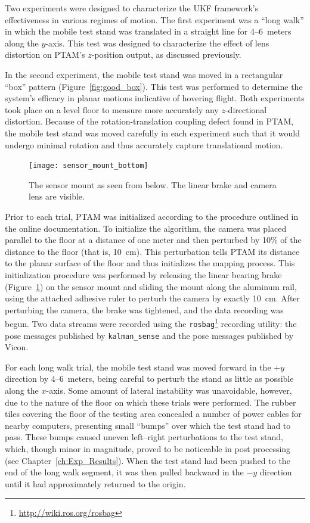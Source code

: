 Two experiments were designed to characterize the UKF framework's effectiveness in various regimes of motion. The first experiment was a ``long walk'' in which the mobile test stand was translated in a straight line for 4--6~meters along the $y$-axis. This test was designed to characterize the effect of lens distortion on PTAM's $z$-position output, as discussed previously.

In the second experiment, the mobile test stand was moved in a rectangular ``box'' pattern (Figure~\ref{fig:good_box}). This test was performed to determine the system's efficacy in planar motions indicative of hovering flight. Both experiments took place on a level floor to measure more accurately any $z$-directional distortion. Because of the rotation-translation coupling defect found in PTAM, the mobile test stand was moved carefully in each experiment such that it would undergo minimal rotation and thus accurately capture translational motion.

\begin{figure}
        \centering
        \texttt{[image: sensor\_mount\_bottom]}
        \caption[Sensor Mount Bottom View]{The sensor mount as seen from below. The linear brake and camera lens are visible.}
        \label{fig:sensor_mount_bottom}
\end{figure}

Prior to each trial, PTAM was initialized according to the procedure outlined in the online documentation. To initialize the algorithm, the camera was placed parallel to the floor at a distance of one meter and then perturbed by 10\% of the distance to the floor (that is, 10~cm). This perturbation tells PTAM its distance to the planar surface of the floor and thus initializes the mapping process. This initialization procedure was performed by releasing the linear bearing brake (Figure~\ref{fig:sensor_mount_bottom}) on the sensor mount and sliding the mount along the aluminum rail, using the attached adhesive ruler to perturb the camera by exactly 10~cm. After perturbing the camera, the brake was tightened, and the data recording was begun. Two data streams were recorded using the \texttt{rosbag}\footnote{\url{http://wiki.ros.org/rosbag}} recording utility: the pose messages published by \texttt{kalman\_sense} and the pose messages published by Vicon.

For each long walk trial, the mobile test stand was moved forward in the $+y$ direction by 4--6~meters, being careful to perturb the stand as little as possible along the $x$-axis. Some amount of lateral instability was unavoidable, however, due to the nature of the floor on which these trials were performed. The rubber tiles covering the floor of the testing area concealed a number of power cables for nearby computers, presenting small ``bumps'' over which the test stand had to pass. These bumps caused uneven left--right perturbations to the test stand, which, though minor in magnitude, proved to be noticeable in post processing (see Chapter~\ref{ch:Exp_Results}). When the test stand had been pushed to the end of the long walk segment, it was then pulled backward in the $-y$ direction until it had approximately returned to the origin.

